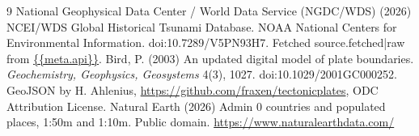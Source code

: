 \documentclass[11pt,a4paper]{article}
\begin{document}
\begin{thebibliography}{9}
 National Geophysical Data Center / World Data Service (NGDC/WDS) (2026) NCEI/WDS Global Historical Tsunami Database. NOAA National Centers for Environmental Information. doi:10.7289/V5PN93H7. Fetched {{source.fetched|raw}} from \url{{{meta.api}}}.
 Bird, P. (2003) An updated digital model of plate boundaries. \textit{Geochemistry, Geophysics, Geosystems} 4(3), 1027. doi:10.1029/2001GC000252. GeoJSON by H. Ahlenius, \url{https://github.com/fraxen/tectonicplates}, ODC Attribution License.
 Natural Earth (2026) Admin 0 countries and populated places, 1:50m and 1:10m. Public domain. \url{https://www.naturalearthdata.com/}
\end{thebibliography}
\end{document}
